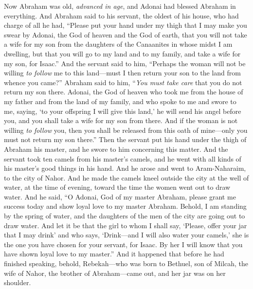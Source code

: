 \begin{biblechapter} %
 Now Abraham was old, \textit{advanced in age}, and Adonai had blessed Abraham in everything.
\verse And Abraham said to his servant, the oldest of his house, who had charge of all he had, “Please put your hand under my thigh
\verse that I may make you swear by Adonai, the God of heaven and the God of earth, that you will not take a wife for my son from the daughters of the Canaanites in whose midst I am dwelling,
\verse but that you will go to my land and to my family, and take a wife for my son, for Isaac.”
\verse And the servant said to him, “Perhaps the woman will not be willing \textit{to follow} me to this land—must I then return your son to the land from whence you came?”
\verse Abraham said to him, “\textit{You must take care} that you do not return my son there.
\verse Adonai, the God of heaven who took me from the house of my father and from the land of my family, and who spoke to me and swore to me, saying, ‘to your offspring I will give this land,’ he will send his angel before you, and you shall take a wife for my son from there.
\verse And if the woman is not willing \textit{to follow} you, then you shall be released from this oath of mine—only you must not return my son there.”
\verse Then the servant put his hand under the thigh of Abraham his master, and he swore to him concerning this matter.
\verse And the servant took ten camels from his master’s camels, and he went with all kinds of his master’s good things in his hand. And he arose and went to Aram-Naharaim, to the city of Nahor.
\verse And he made the camels kneel outside the city at the well of water, at the time of evening, toward the time the women went out to draw water.
\verse And he said, “O Adonai, God of my master Abraham, please grant me success today and show loyal love to my master Abraham.
\verse Behold, I am standing by the spring of water, and the daughters of the men of the city are going out to draw water.
\verse And let it be that the girl to whom I shall say, ‘Please, offer your jar that I may drink’ and who says, ‘Drink—and I will also water your camels,’ she is the one you have chosen for your servant, for Isaac. By her I will know that you have shown loyal love to my master.”
\verse And it happened that before he had finished speaking, behold, Rebekah—who was born to Bethuel, son of Milcah, the wife of Nahor, the brother of Abraham—came out, and her jar was on her shoulder.

\end{biblechapter}
